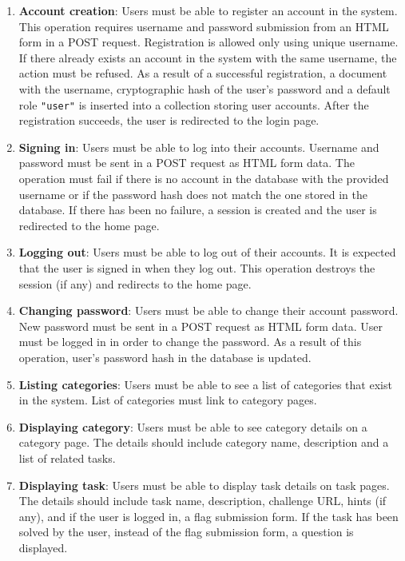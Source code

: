 \begin{enumerate}
	\item \textbf{Account creation}: Users must be able to register an account in the system.
	This operation requires username and password submission from an HTML form in a POST request.
	Registration is allowed only using unique username. If there already exists an account in the system with the same username, the action must be refused.
	As a result of a successful registration, a document with the username, cryptographic hash of the user's password and a default role \texttt{"user"} is inserted into a collection storing user accounts. After the registration succeeds, the user is redirected to the login page.

	\item \textbf{Signing in}: Users must be able to log into their accounts.
	Username and password must be sent in a POST request as HTML form data. The operation must fail if there is no account in the database with the provided username or if the password hash does not match the one stored in the database.
	If there has been no failure, a session is created and the user is redirected to the home page.

	\item \textbf{Logging out}: Users must be able to log out of their accounts.
	It is expected that the user is signed in when they log out. This operation destroys the session (if any) and redirects to the home page.

	\item \textbf{Changing password}: Users must be able to change their account password.
	New password must be sent in a POST request as HTML form data. User must be logged in in order to change the password.
	As a result of this operation, user's password hash in the database is updated.

	\item \textbf{Listing categories}: Users must be able to see a list of categories that exist in the system. List of categories must link to category pages.

	\item \textbf{Displaying category}: Users must be able to see category details on a category page. The details should include category name, description and a list of related tasks.

	\item  \textbf{Displaying task}: Users must be able to display task details on task pages. The details should include task name, description, challenge URL, hints (if any), and if the user is logged in, a flag submission form. If the task has been solved by the user, instead of the flag submission form, a question is displayed.


\end{enumerate}
